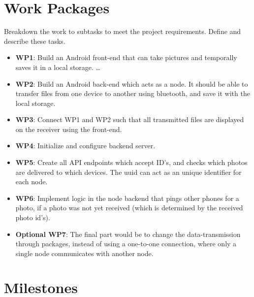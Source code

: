\documentclass{report}
\begin{document}
\section{Work Packages}
Breakdown the work to subtasks to meet the project requirements.
Define and describe these tasks.

\begin{itemize}
        \item {\bf WP1}:  Build an Android front-end that can take pictures and temporally saves it in a local storage.  \ldots    
        \item {\bf WP2}:  Build an Android back-end which acts as a node. It should be able to transfer files from one device to another using bluetooth, and save it with the local storage.
        \item {\bf WP3}: Connect WP1 and WP2 such that all transmitted files are displayed on the receiver using the front-end.    
        \item {\bf WP4}: Initialize and configure backend server.    
        \item {\bf WP5}: Create all API endpoints which accept ID's, and checks which photos are delivered to which devices. The uuid can act as an unique identifier for each node.    
        \item {\bf WP6}: Implement logic in the node backend that pings other phones for a photo, if a photo was not yet received (which is determined by the received photo id's).   
         \item {\bf Optional WP7}: The final part would be to change the data-transmission through packages, instead of using a one-to-one connection, where only a single node communicates with another node.
\end{itemize}
 
\section{Milestones}
\end{document}
